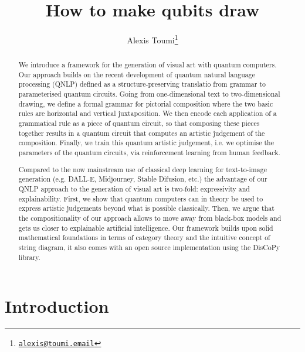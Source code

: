 

\title{How to make qubits draw}

\author{Alexis Toumi\thanks{\href{alexis@toumi.email}{\texttt{alexis@toumi.email}}}}





\maketitle

\begin{abstract}
We introduce a framework for the generation of visual art with quantum computers.
Our approach builds on the recent development of quantum natural language processing (QNLP) defined as a structure-preserving translatio from grammar to parameterised quantum circuits.
Going from one-dimensional text to two-dimensional drawing, we define a formal grammar for pictorial composition where the two basic rules are horizontal and vertical juxtaposition.
We then encode each application of a grammatical rule as a piece of quantum circuit, so that composing these pieces together results in a quantum circuit that computes an artistic judgement of the composition.
Finally, we train this quantum artistic judgement, i.e. we optimise the parameters of the quantum circuits, via reinforcement learning from human feedback.

Compared to the now mainstream use of classical deep learning for text-to-image generation (e.g. DALL-E, Midjourney, Stable Difusion, etc.) the advantage of our QNLP approach to the generation of visual art is two-fold: expressivity and explainability.
First, we show that quantum computers can in theory be used to express artistic judgements beyond what is possible classically.
Then, we argue that the compositionality of our approach allows to move away from black-box models and gets us closer to explainable artificial intelligence.
Our framework builds upon solid mathematical foundations in terms of category theory and the intuitive concept of string diagram, it also comes with an open source implementation using the DisCoPy library.
\end{abstract}

\section*{Introduction}

